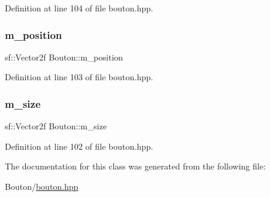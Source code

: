 Definition at line 104 of file bouton.\+hpp.

\mbox{\label{classBouton_ab667f97c8bdea7263faa608d5efa67c2}} 
\subsubsection{\texorpdfstring{m\+\_\+position}{m\_position}}
{\footnotesize\ttfamily sf\+::\+Vector2f Bouton\+::m\+\_\+position\hspace{0.3cm}{\ttfamily [protected]}}



Definition at line 103 of file bouton.\+hpp.

\mbox{\label{classBouton_aad1cc2d04d21e0145520b28053371c4e}} 
\subsubsection{\texorpdfstring{m\+\_\+size}{m\_size}}
{\footnotesize\ttfamily sf\+::\+Vector2f Bouton\+::m\+\_\+size\hspace{0.3cm}{\ttfamily [protected]}}



Definition at line 102 of file bouton.\+hpp.



The documentation for this class was generated from the following file\+:\begin{DoxyCompactItemize}
\item 
Bouton/\hyperlink{bouton_8hpp}{bouton.\+hpp}\end{DoxyCompactItemize}
